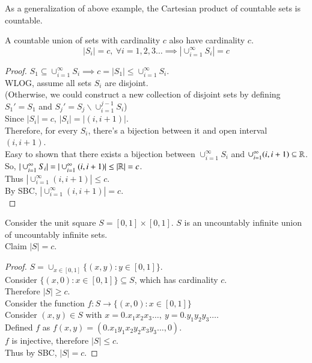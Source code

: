 \documentclass[10pt]{article}
\begin{document}
		\begin{corollary}
			As a generalization of above example, the Cartesian product of countable sets is countable.
		\end{corollary}
		
		\begin{theorem}
			A countable union of sets with cardinality $c$ also have cardinality $c$.
			\[
				|S_i| = c, \ \forall i = 1,2,3\dots \implies |\cup_{i=1}^\infty S_i| = c
			\]
			\begin{proof}
				$S_1 \subseteq \cup_{i=1}^\infty S_i \implies c = |S_1| \leq \cup_{i=1}^\infty S_i$. \\
				WLOG, assume all sets $S_i$ are disjoint. \\
				(Otherwise, we could construct a new collection of disjoint sets by defining $S_1' = S_1$ and $S_j' = S_j \backslash \cup_{i=1}^{j-1} S_{i}$) \\
				Since $|S_i| = c$, $|S_i| = |(i, i+1)|$. \\
				Therefore, for every $S_i$, there's a bijection between it and open interval $(i, i+1)$. \\
				Easy to shown that there exists a bijection between $\cup_{i=1}^\infty S_i$ and $\cup_{i=1}^\infty (i, i+1) \subseteq \mathbb{R}$. \\
				So, $|\cup_{i=1}^\infty S_i| = |\cup_{i=1}^\infty (i, i+1)| \leq |\mathbb{R}| = c$. \\
				Thus $|\cup_{i=1}^\infty (i, i+1)| \leq c$. \\
				By SBC, $|\cup_{i=1}^\infty (i, i+1)| = c$. \\
			\end{proof}
		\end{theorem}
		
		\begin{example}
			Consider the unit square $S=[0,1]\times [0,1]$. $S$ is an uncountably infinite union of uncountably infinite sets.\\
			Claim $|S| = c$. \\
			\begin{proof}
				$S = \cup_{x\in [0,1]}\{(x,y):y\in[0,1]\}$. \\
				Consider $\{(x, 0):x \in [0,1]\} \subseteq S$, which has cardinality $c$. \\
				Therefore $|S| \geq c$. \\
				Consider the function $f: S \to \{(x, 0):x \in [0,1]\}$ \\
				Consider $(x,y) \in S$ with $x = 0.x_1 x_2 x_3 \dots,\ y=0.y_1 y_2 y_3 \dots$. \\
				Defined $f$ as $f(x, y) = (0.x_1 y_1 x_2 y_2 x_3 y_3\dots, 0)$.\\
				$f$ is injective, therefore $|S| \leq c$. \\
				Thus by SBC, $|S| = c$.
			\end{proof}
		\end{example}
	
\end{document}

